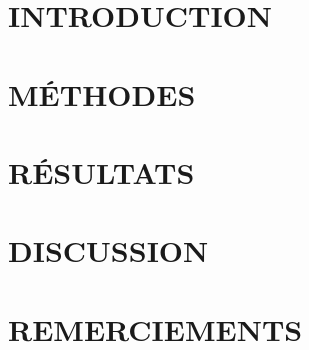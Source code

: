 \documentclass[11pt]{book}
\begin{document}
\frontmatter

\section{INTRODUCTION}\label{sec:introduction}

 

\section{MÉTHODES}\label{sec:METHODS}


 




\section{RÉSULTATS}\label{sec:results}



\section{DISCUSSION}\label{sec:discussion}

  

\section{REMERCIEMENTS}\label{sec:acknowledgements}
\end{document}

